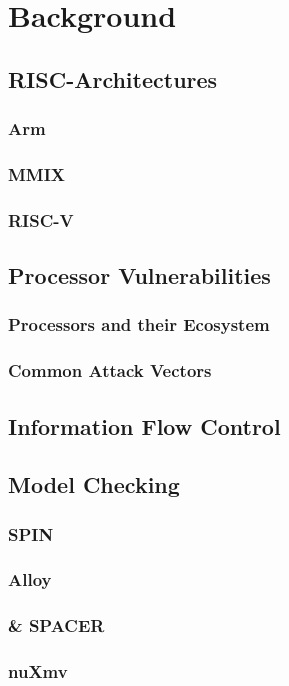 
\section{Background}

\subsection{RISC-Architectures}

\subsubsection{Arm}

\subsubsection{MMIX}

\subsubsection{RISC-V}

\subsection{Processor Vulnerabilities}

\subsubsection{Processors and their Ecosystem}

\subsubsection{Common Attack Vectors}

\subsection{Information Flow Control}

\subsection{Model Checking}

\subsubsection{SPIN}

\subsubsection{Alloy}

\subsubsection{\muZ{} \& SPACER}

\subsubsection{nuXmv}
